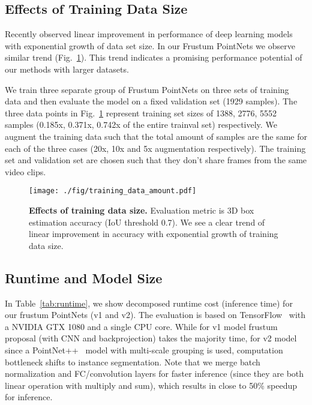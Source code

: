 \documentclass[10pt,twocolumn,letterpaper]{article}
\begin{document}
\subsection{Effects of Training Data Size}

Recently \cite{sun2017revisiting} observed linear improvement in performance of deep learning models with exponential growth of data set size. In our Frustum PointNets we observe similar trend (Fig.~\ref{fig:training_data_size}). This trend indicates a promising performance potential of our methods with larger datasets.

We train three separate group of Frustum PointNets on three sets of training data and then evaluate the model on a fixed validation set (1929 samples). The three data points in Fig.~\ref{fig:training_data_size} represent training set sizes of 1388, 2776, 5552 samples (0.185x, 0.371x, 0.742x of the entire trainval set) respectively. We augment the training data such that the total amount of samples are the same for each of the three cases (20x, 10x and 5x augmentation respectively). The training set and validation set are chosen such that they don't share frames from the same video clips.

\begin{figure}[h!]
    \centering
    \texttt{[image: ./fig/training\_data\_amount.pdf]}
    \caption{\textbf{Effects of training data size.} Evaluation metric is 3D box estimation accuracy (IoU threshold 0.7). We see a clear trend of linear improvement in accuracy with exponential growth of training data size.}
    \label{fig:training_data_size}
\end{figure}

\subsection{Runtime and Model Size}
\label{sec:runtime}
In Table~\ref{tab:runtime}, we show decomposed runtime cost (inference time) for our frustum PointNets (v1 and v2). The evaluation is based on TensorFlow~\cite{abadi2016tensorflow} with a NVIDIA GTX 1080 and a single CPU core. While for v1 model frustum proposal (with CNN and backprojection) takes the majority time, for v2 model since a PointNet++~\cite{qi2017pointnetplusplus} model with multi-scale grouping is used, computation bottleneck shifts to instance segmentation. Note that we merge batch normalization and FC/convolution layers for faster inference (since they are both linear operation with multiply and sum), which results in close to 50\% speedup for inference.
\end{document}
